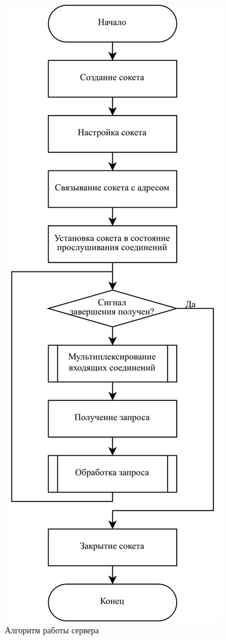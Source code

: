 \begin{figure}[H]
	\centering
	\includegraphics[scale=0.2]{assets/server.png}
	\caption{Алгоритм работы сервера}
	\label{fig:server}
\end{figure}



